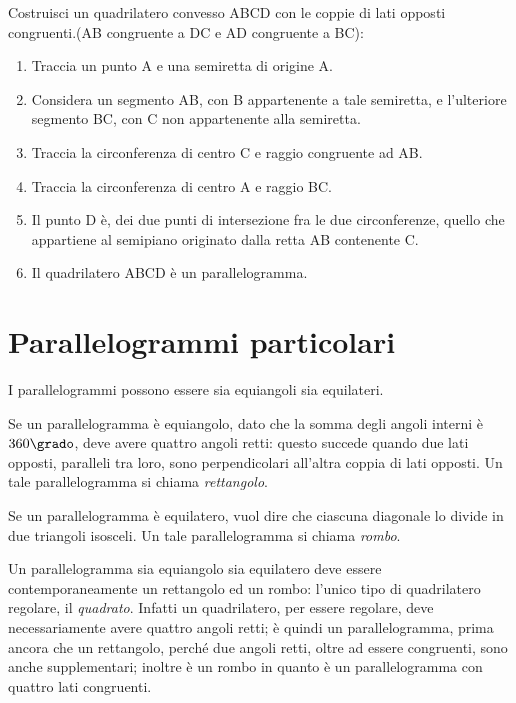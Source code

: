 \begin{procedura}
Costruisci un quadrilatero convesso ABCD con le coppie di lati opposti 
congruenti.(AB congruente a DC e AD congruente a BC):
\begin{enumerate} [nosep]
\item 
Traccia un punto A e una semiretta di origine A.
\item 
Considera un segmento AB, con B appartenente a tale semiretta, e 
l'ulteriore segmento BC, con C non appartenente alla semiretta.
\item 
Traccia la circonferenza di centro C e raggio congruente ad AB.
\item 
Traccia la circonferenza di centro A e raggio BC.
\item
Il punto D è, dei due punti di intersezione fra le due circonferenze, 
quello che appartiene al semipiano originato dalla retta AB contenente C.
\item 
Il quadrilatero ABCD è un parallelogramma.
\end{enumerate}
\end{procedura}


\section{Parallelogrammi particolari}
  \label{sect:parallelogrammi_particolari}

I parallelogrammi possono essere sia equiangoli sia equilateri.

\noindent\begin{minipage}{0.7\textwidth}\parindent15pt
  Se un parallelogramma è equiangolo, dato che la somma degli angoli 
  interni è \(360\grado\), deve avere quattro angoli retti: questo 
  succede quando due lati opposti, paralleli tra loro, sono 
  perpendicolari all’altra coppia di lati opposti. Un tale 
  parallelogramma si chiama \emph{rettangolo}.
  
  Se un parallelogramma è equilatero, vuol dire che ciascuna diagonale 
  lo divide in due triangoli isosceli. Un tale parallelogramma si 
  chiama \emph{rombo}.
  
  Un parallelogramma sia equiangolo sia equilatero deve essere 
  contemporaneamente un rettangolo ed un rombo: l'unico tipo di 
  quadrilatero regolare, il \emph{quadrato}. Infatti un quadrilatero, 
  per essere regolare, deve necessariamente avere quattro angoli retti; 
  è quindi un parallelogramma, prima ancora che un rettangolo, perché 
  due angoli retti, oltre ad essere congruenti, sono anche 
  supplementari; inoltre è un rombo in quanto è un parallelogramma con 
  quattro lati congruenti.
\end{minipage}\hfil
\begin{minipage}{0.3\textwidth}
  \centering\\~\\
  \centering\\~\\
  \centering
\end{minipage}

